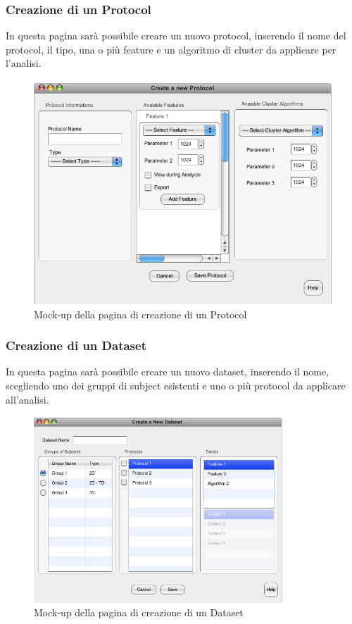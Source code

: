 \subsubsection{Creazione di un Protocol}
In questa pagina sarà possibile creare un nuovo protocol\glossario{}, inserendo il nome del protocol\glossario{}, il tipo, una o più feature\glossario{} e un algoritmo di cluster\glossario{} da applicare per l'analisi.
\begin{figure}[htp]
	\centering
	\includegraphics[width=0.75\linewidth]{./Content/Immagini/Prototype-v0.1/filesystemdoc_8_6}
	\caption{Mock-up della pagina di creazione di un Protocol}
	\label{new_protocol}
\end{figure}

\subsubsection{Creazione di un Dataset}
In questa pagina sarà possibile creare un nuovo dataset\glossario{}, inserendo il nome, scegliendo uno dei gruppi di subject\glossario{} esistenti e uno o più protocol\glossario{} da applicare all'analisi.

\begin{figure}[htp]
	\centering
	\includegraphics[width=0.75\linewidth,height=7cm]{./Content/Immagini/Prototype-v0.1/filesystemdoc_8_8}
	\caption{Mock-up della pagina di creazione di un Dataset}
	\label{new_dataset}
\end{figure}
\pagebreak
